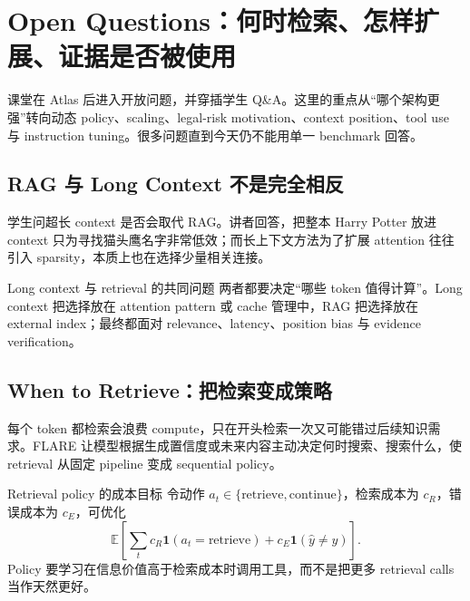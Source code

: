 \section{Open Questions：何时检索、怎样扩展、证据是否被使用}

课堂在 Atlas 后进入开放问题，并穿插学生 Q\&A。这里的重点从“哪个架构更强”转向动态 policy、scaling、legal-risk motivation、context position、tool use 与 instruction tuning。很多问题直到今天仍不能用单一 benchmark 回答。

\subsection{RAG 与 Long Context 不是完全相反}

学生问超长 context 是否会取代 RAG。讲者回答，把整本 Harry Potter 放进 context 只为寻找猫头鹰名字非常低效；而长上下文方法为了扩展 attention 往往引入 sparsity，本质上也在选择少量相关连接。

\begin{knowledgebox}{Long context 与 retrieval 的共同问题}
两者都要决定“哪些 token 值得计算”。Long context 把选择放在 attention pattern 或 cache 管理中，RAG 把选择放在 external index；最终都面对 relevance、latency、position bias 与 evidence verification。
\end{knowledgebox}


\subsection{When to Retrieve：把检索变成策略}

每个 token 都检索会浪费 compute，只在开头检索一次又可能错过后续知识需求。FLARE 让模型根据生成置信度或未来内容主动决定何时搜索、搜索什么，使 retrieval 从固定 pipeline 变成 sequential policy。


\begin{importantbox}{Retrieval policy 的成本目标}
令动作 $a_t\in\{\text{retrieve},\text{continue}\}$，检索成本为 $c_R$，错误成本为 $c_E$，可优化
\[
\mathbb{E}\!\left[\sum_t c_R\mathbf{1}(a_t=\text{retrieve})
+c_E\mathbf{1}(\hat y\ne y)\right].
\]
Policy 要学习在信息价值高于检索成本时调用工具，而不是把更多 retrieval calls 当作天然更好。
\end{importantbox}

